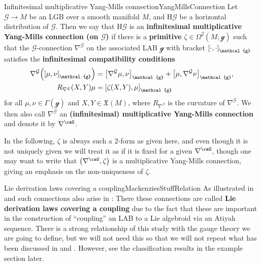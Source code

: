 \documentclass[reqno,a4paper,oneside]{amsart}
\theoremstyle{plain}
\theoremstyle{remark}
\theoremstyle{definition}
\begin{document}
\begin{definitions}{Infinitesimal multiplicative Yang-Mills connection}{YangMillsConnection}
Let $\mathcal{G} \to M$ be an LGB over a smooth manifold $M$, and $\mathrm{H}\mathcal{G}$ be a horizontal distribution of $\mathcal{G}$. Then we say that $\mathrm{H}\mathcal{G}$ is an \textbf{infinitesimal multiplicative Yang-Mills connection (on $\mathcal{G}$)} if there is a \textbf{primitive} $\zeta \in \Omega^2(M; \mathcal{g})$ such that the $\mathcal{G}$-connection $\nabla^{\mathcal{G}}$ on the associated LAB $\mathcal{g}$ with bracket $\mleft[ \cdot, \cdot \mright]_{\mathcal{g}}$ satisfies the \textbf{infinitesimal compatibility conditions}
\begin{align}\label{CondSGleichNullLAB}
\nabla^{\mathcal{G}}\mleft( \mleft[ \mu, \nu \mright]_{\mathcal{g}} \mright)
&=
\mleft[ \nabla^{\mathcal{G}} \mu, \nu \mright]_{\mathcal{g}}
	+ \mleft[ \mu, \nabla^{\mathcal{G}} \nu \mright]_{\mathcal{g}},
\\
R_{\nabla^{\mathcal{G}}}(X, Y)\mu
&=
\mleft[ \zeta(X, Y), \mu \mright]_{\mathcal{g}}\label{CondKruemmungmitBLAB}
\end{align}
for all $\mu, \nu \in \Gamma(\mathcal{g})$ and $X, Y \in \mathfrak{X}(M)$, where $R_{\nabla^{\mathcal{G}}}$ is the curvature of $\nabla^{\mathcal{G}}$. We then also call $\nabla^{\mathcal{G}}$ an \textbf{(infinitesimal) multiplicative Yang-Mills connection} and denote it by $\nabla^\caG$.

In the following, $\zeta$ is always such a 2-form as given here, and even though it is not uniquely given we will treat it as if it is fixed for a given $\nabla^\caG$, though one may want to write that $\mleft( \nabla^\caG, \zeta \mright)$ is a multiplicative Yang-Mills connection, giving an emphasis on the non-uniqueness of $\zeta$. 
\end{definitions}

\begin{remarks}{Lie derivation laws covering a coupling}{MackenziesStuffRelation}
As illustrated in \cite[\S 5.1]{MyThesis} and \cite{My1stpaper} such connections also arise in \cite[\S 7.2, page 271ff.]{mackenzieGeneralTheory}: There these connections are called \textbf{Lie derivation laws covering a coupling} due to the fact that these are important in the construction of ``coupling'' an LAB to a Lie algebroid via an Atiyah sequence. There is a strong relationship of this study with the gauge theory we are going to define, but we will not need this so that we will not repeat what has been discussed in \cite[\S 5.1]{MyThesis} and \cite{My1stpaper}. However, see the classification results in the example section later.
%
\end{remarks}
\end{document}
